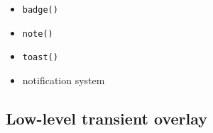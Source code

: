\begin{itemize}
  \begin{itemize}
  \tightlist
  \item
    \texttt{b\allowbreak{}a\allowbreak{}d\allowbreak{}g\allowbreak{}e\allowbreak{}(\allowbreak{})}
  \item
    \texttt{n\allowbreak{}o\allowbreak{}t\allowbreak{}e\allowbreak{}(\allowbreak{})}
  \item
    \texttt{t\allowbreak{}o\allowbreak{}a\allowbreak{}s\allowbreak{}t\allowbreak{}(\allowbreak{})}
  \item
    notification system
  \end{itemize}
\end{itemize}

\subsection{Low-level transient overlay}\label{record-019-low-level-transient-overlay}

